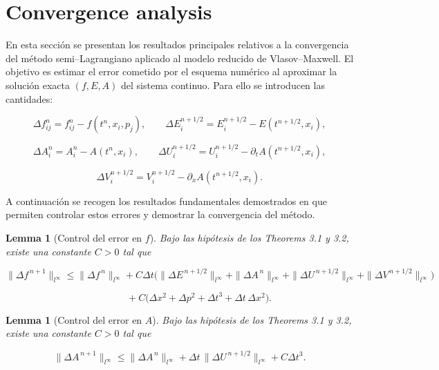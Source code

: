 \documentclass[11pt,a4paper,twoside,pdf]{article}
\numberwithin{equation}{section}
\newtheorem{lemma}[theorem]{Lemma}
\begin{document}
\newpage
\section{Convergence analysis}

En esta sección se presentan los resultados principales relativos a la convergencia del
método semi–Lagrangiano aplicado al modelo reducido de Vlasov–Maxwell. El
objetivo es estimar el error cometido por el esquema numérico al aproximar la
solución exacta $(f,E,A)$ del sistema continuo. Para ello se introducen las cantidades:


\[
\Delta f^n_{ij} = f^n_{ij} - f(t^n,x_i,p_j), \qquad
\Delta E^{n+1/2}_i = E^{n+1/2}_i - E(t^{n+1/2},x_i),
\]




\[
\Delta A^n_i = A^n_i - A(t^n,x_i), \qquad
\Delta U^{n+1/2}_i = U^{n+1/2}_i - \partial_t A(t^{n+1/2},x_i),
\]




\[
\Delta V^{n+1/2}_i = V^{n+1/2}_i - \partial_x A(t^{n+1/2},x_i).
\]



A continuación se recogen los resultados fundamentales demostrados en \cite{bostan2009convergence} que permiten controlar estos
errores y demostrar la convergencia del método.\\





\begin{lemma}[Control del error en $f$]
Bajo las hipótesis de los Theorems 3.1 y 3.2, existe una constante $C>0$ tal que


\[
\|\Delta f^{\,n+1}\|_{l^\infty}
\le \|\Delta f^{\,n}\|_{l^\infty}
+ C\Delta t\big(
\|\Delta E^{\,n+1/2}\|_{l^\infty}
+ \|\Delta A^{\,n}\|_{l^\infty}
+ \|\Delta U^{\,n+1/2}\|_{l^\infty}
+ \|\Delta V^{\,n+1/2}\|_{l^\infty}
\big)
\]




\[
\qquad\qquad
+ C\big(\Delta x^2 + \Delta p^2 + \Delta t^3 + \Delta t\,\Delta x^2\big).
\]


\end{lemma}



\begin{lemma}[Control del error en $A$]
Bajo las hipótesis de los Theorems 3.1 y 3.2, existe una constante $C>0$ tal que


\[
\|\Delta A^{\,n+1}\|_{l^\infty}
\le \|\Delta A^{\,n}\|_{l^\infty}
+ \Delta t\,\|\Delta U^{\,n+1/2}\|_{l^\infty}
+ C\Delta t^3.
\]


\end{lemma}
\end{document}
